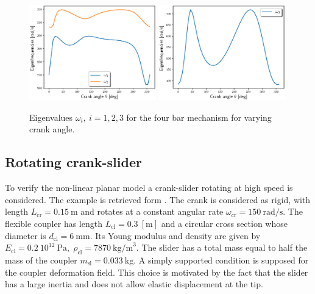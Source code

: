 \documentclass{svjour3}                     %
\begin{document}
\begin{figure}[tb]
	\centering
	\includegraphics[width=0.49\textwidth]{FourBar_Om12.eps} 
	\includegraphics[width=0.49\textwidth]{FourBar_Om3.eps} 
	\caption{Eigenvalues $\omega_i, \ i=1,2,3$ for the four bar mechanism for varying crank angle.}
	\label{fig:omega_4bars}
\end{figure}

\subsection{Rotating crank-slider}
To verify the non-linear planar model a crank-slider rotating at high speed is considered. The example is retrieved form \cite{Ellenbroek2018}.  The crank is considered as rigid, with length $L_{\text{cr}} = 0.15 \ \mathrm{m}$ and rotates at a constant angular rate $\omega_{\text{cr}} = 150 \ \mathrm{rad/s}$. The flexible coupler has length $L_{\text{cl}} = 0.3 \ [\mathrm{m}]$ and a circular cross section whose diameter is $d_{\text{cl}} = 6 \ \mathrm{mm}$. Its Young modulus and density are given by $E_{\text{cl}}=0.2 \ 10^{12} \ \mathrm{Pa}, \; \rho_{\text{cl}}=7870 \ \mathrm{kg/m}^3$. The slider has a total mass equal to half the mass of the coupler $m_{\text{sl}} = 0.033 \ \mathrm{kg}$. A simply supported condition is supposed for the coupler deformation field. This choice is motivated by the fact that the slider has a large inertia and does not allow elastic displacement at the tip.
\end{document}
